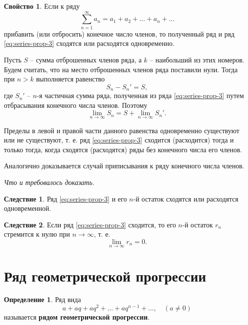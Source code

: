 \documentclass[a5paper, 11pt]{extbook}
\theoremstyle{definition}
\newtheorem{property}{Свойство}[section]
\theoremstyle{definition}
\theoremstyle{definition}
\newtheorem*{definition*}{Определение}
\newtheorem{consequence}{Следствие}[section]
\newcommand{\newpar}{$ $\par\nobreak\ignorespaces}
\renewenvironment{proof}{{\noindent\bfseries Доказательство.}}{\smallskip\newpar \hfill\textit{Что и требовалось доказать.}}
\begin{document}
\begin{property}
    Если к ряду
    \begin{equation}
        \label{eq:series-prop-3}
        \sum_{n = 1}^{\infty} a_n = a_1 + a_2 + \ldots + a_n + \ldots
    \end{equation}
    прибавить (или отбросить) конечное число членов, то полученный ряд и ряд \eqref{eq:series-prop-3} сходятся или расходятся одновременно.

    \begin{proof}
        Пусть \(S\) -- сумма отброшенных членов ряда, а \(k\) -- наибольший из этих номеров. Будем считать, что на место отброшенных членов ряда поставили нули. Тогда при \(n > k\) выполняется равенство
        \[
            S_n - S_n' = S,
        \]
        где \(S_n'\) -- \(n\)-я частичная сумма ряда, полученная из ряда \eqref{eq:series-prop-3} путем отбрасывания конечного числа членов. Поэтому
        \[
            \lim_{n \to \infty} S_n = S + \lim_{n \to \infty} S_n'.
        \]

        Пределы в левой и правой части данного равенства одновременно существуют или не существуют, т. е. ряд \eqref{eq:series-prop-3} сходится (расходится) тогда и только тогда, когда сходятся (расходятся) ряды без конечного числа его членов.

        Аналогично доказывается случай приписывания к ряду конечного числа членов.
    \end{proof}
    \begin{consequence}
        Ряд \eqref{eq:series-prop-3} и его \(n\)-й остаток сходятся или расходятся одновременной.
    \end{consequence}
    \begin{consequence}
        Если ряд \eqref{eq:series-prop-3} сходится, то его \(n\)-й остаток \(r_n\) стремится к нулю при \(n \to \infty\), т. е.
        \[
            \lim_{n \to \infty} r_n = 0.
        \]
    \end{consequence}
\end{property}

\section{Ряд геометрической прогрессии}

\begin{definition*}
    Ряд вида
    \[
        a + aq + aq^2 + \ldots + aq^{n - 1} + \ldots,
        \quad
        (a \neq 0)
    \]
    называется \textbf{рядом геометрической прогрессии}.
\end{definition*}
\end{document}

